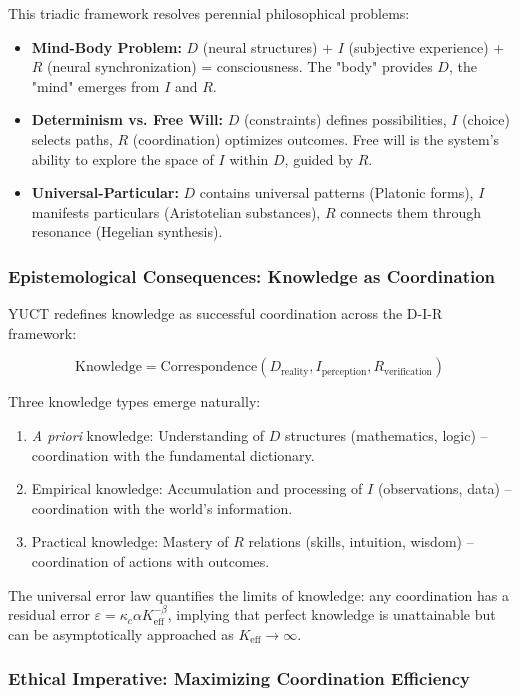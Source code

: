 \documentclass[12pt,a4paper]{article}
\newcommand{\eff}{\mathrm{eff}}
\newcommand{\Ke}{K_{\eff}}
\begin{document}
	This triadic framework resolves perennial philosophical problems:
	
	\begin{itemize}
		\item \textbf{Mind-Body Problem:} $D$ (neural structures) + $I$ (subjective experience) + $R$ (neural synchronization) = consciousness. The "body" provides $D$, the "mind" emerges from $I$ and $R$.
		\item \textbf{Determinism vs. Free Will:} $D$ (constraints) defines possibilities, $I$ (choice) selects paths, $R$ (coordination) optimizes outcomes. Free will is the system's ability to explore the space of $I$ within $D$, guided by $R$.
		\item \textbf{Universal-Particular:} $D$ contains universal patterns (Platonic forms), $I$ manifests particulars (Aristotelian substances), $R$ connects them through resonance (Hegelian synthesis).
	\end{itemize}
	
	\subsubsection{Epistemological Consequences: Knowledge as Coordination}
	
	YUCT redefines knowledge as successful coordination across the D-I-R framework:
	
	\[
	\text{Knowledge} = \text{Correspondence}(D_{\text{reality}}, I_{\text{perception}}, R_{\text{verification}})
	\]
	
	Three knowledge types emerge naturally:
	\begin{enumerate}
		\item \textit{A priori} knowledge: Understanding of $D$ structures (mathematics, logic) – coordination with the fundamental dictionary.
		\item Empirical knowledge: Accumulation and processing of $I$ (observations, data) – coordination with the world's information.
		\item Practical knowledge: Mastery of $R$ relations (skills, intuition, wisdom) – coordination of actions with outcomes.
	\end{enumerate}
	
	The universal error law quantifies the limits of knowledge: any coordination has a residual error $\varepsilon = \kappa_c \alpha \Ke^{-\beta}$, implying that perfect knowledge is unattainable but can be asymptotically approached as $\Ke \to \infty$.
	
	\subsubsection{Ethical Imperative: Maximizing Coordination Efficiency}
	
\end{document}
